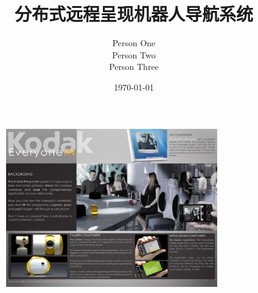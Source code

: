 \documentclass[11pt,letterpaper,oneside]{memoir}
\title{分布式远程呈现机器人导航系统
}
\author{Person One\\
    Person Two\\
    Person Three}
\date{\today}
\begin{document}
\begin{figure}[t]
\centering
  \includegraphics[height= 7cm]{Figures/Ch1frontmatter/KodakThing.pdf}
\end{figure}

\titlep



\renewcommand{\chaptitlefont}{\normalfont\Large\bfseries}
\newpage
\tableofcontents*  %

\newpage
\listoffigures*  %

\renewcommand{\chaptitlefont}{\normalfont\Huge\bfseries}

\newpage
\end{document}
